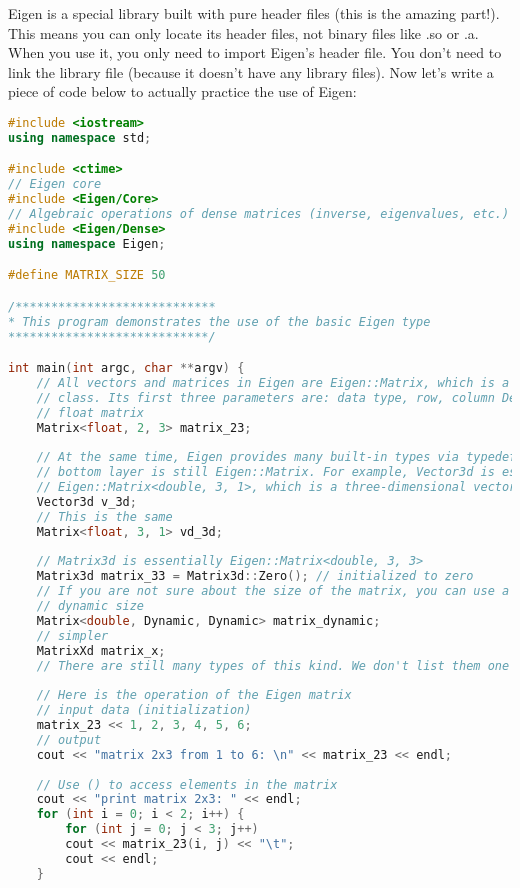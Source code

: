 Eigen is a special library built with pure header files (this is the amazing part!). This means you can only locate its header files, not binary files like .so or .a. When you use it, you only need to import Eigen's header file. You don't need to link the library file (because it doesn't have any library files). Now let's write a piece of code below to actually practice the use of Eigen:
\begin{lstlisting}[language=c++,caption=slambook2/ch3/useEigen/eigenMatrix.cpp]
#include <iostream>
using namespace std;

#include <ctime>
// Eigen core
#include <Eigen/Core>
// Algebraic operations of dense matrices (inverse, eigenvalues, etc.)
#include <Eigen/Dense>
using namespace Eigen;

#define MATRIX_SIZE 50

/****************************
* This program demonstrates the use of the basic Eigen type
****************************/

int main(int argc, char **argv) {
    // All vectors and matrices in Eigen are Eigen::Matrix, which is a template
    // class. Its first three parameters are: data type, row, column Declare a 2*3
    // float matrix
    Matrix<float, 2, 3> matrix_23;
    
    // At the same time, Eigen provides many built-in types via typedef, but the
    // bottom layer is still Eigen::Matrix. For example, Vector3d is essentially
    // Eigen::Matrix<double, 3, 1>, which is a three-dimensional vector.
    Vector3d v_3d;
    // This is the same
    Matrix<float, 3, 1> vd_3d;
    
    // Matrix3d is essentially Eigen::Matrix<double, 3, 3>
    Matrix3d matrix_33 = Matrix3d::Zero(); // initialized to zero
    // If you are not sure about the size of the matrix, you can use a matrix of
    // dynamic size
    Matrix<double, Dynamic, Dynamic> matrix_dynamic;
    // simpler
    MatrixXd matrix_x;
    // There are still many types of this kind. We don't list them one by one.
    
    // Here is the operation of the Eigen matrix
    // input data (initialization)
    matrix_23 << 1, 2, 3, 4, 5, 6;
    // output
    cout << "matrix 2x3 from 1 to 6: \n" << matrix_23 << endl;
    
    // Use () to access elements in the matrix
    cout << "print matrix 2x3: " << endl;
    for (int i = 0; i < 2; i++) {
        for (int j = 0; j < 3; j++)
        cout << matrix_23(i, j) << "\t";
        cout << endl;
    }
    

\end{lstlisting}
